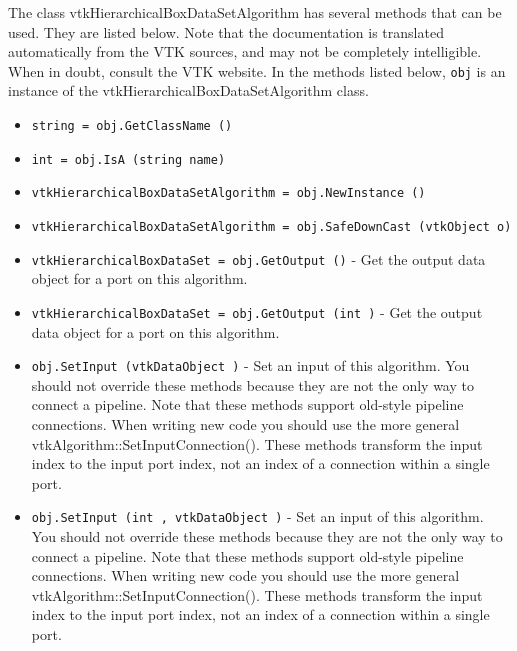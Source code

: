 The class vtkHierarchicalBoxDataSetAlgorithm has several methods that can be used.
  They are listed below.
Note that the documentation is translated automatically from the VTK sources,
and may not be completely intelligible.  When in doubt, consult the VTK website.
In the methods listed below, \verb|obj| is an instance of the vtkHierarchicalBoxDataSetAlgorithm class.
\begin{itemize}
\item  \verb|string = obj.GetClassName ()|

\item  \verb|int = obj.IsA (string name)|

\item  \verb|vtkHierarchicalBoxDataSetAlgorithm = obj.NewInstance ()|

\item  \verb|vtkHierarchicalBoxDataSetAlgorithm = obj.SafeDownCast (vtkObject o)|

\item  \verb|vtkHierarchicalBoxDataSet = obj.GetOutput ()| -  Get the output data object for a port on this algorithm.

\item  \verb|vtkHierarchicalBoxDataSet = obj.GetOutput (int )| -  Get the output data object for a port on this algorithm.

\item  \verb|obj.SetInput (vtkDataObject )| -  Set an input of this algorithm. You should not override these
 methods because they are not the only way to connect a pipeline.
 Note that these methods support old-style pipeline connections.
 When writing new code you should use the more general
 vtkAlgorithm::SetInputConnection().  These methods transform the
 input index to the input port index, not an index of a connection
 within a single port.

\item  \verb|obj.SetInput (int , vtkDataObject )| -  Set an input of this algorithm. You should not override these
 methods because they are not the only way to connect a pipeline.
 Note that these methods support old-style pipeline connections.
 When writing new code you should use the more general
 vtkAlgorithm::SetInputConnection().  These methods transform the
 input index to the input port index, not an index of a connection
 within a single port.

\end{itemize}
